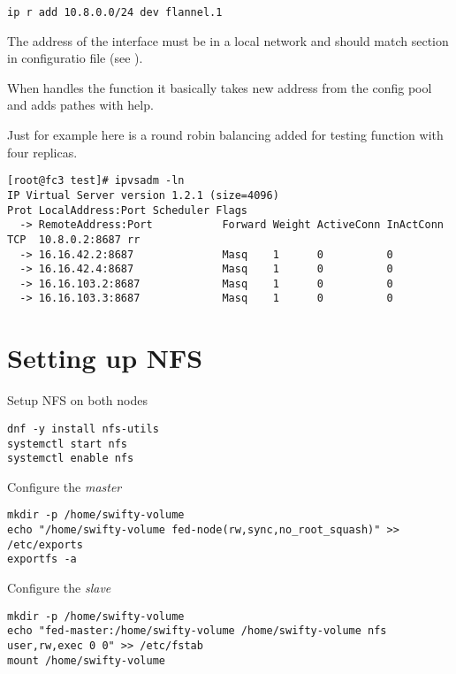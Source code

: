 \begin{lstlisting}
ip r add 10.8.0.0/24 dev flannel.1
\end{lstlisting}

The address of the interface must be in a local network and
should match  section in configuratio file
(see ).

When  handles the function it basically takes new
address from the config pool and adds pathes with 
help.

Just for example here is a round robin balancing added for
testing function with four replicas.

\begin{lstlisting}
[root@fc3 test]# ipvsadm -ln
IP Virtual Server version 1.2.1 (size=4096)
Prot LocalAddress:Port Scheduler Flags
  -> RemoteAddress:Port           Forward Weight ActiveConn InActConn
TCP  10.8.0.2:8687 rr
  -> 16.16.42.2:8687              Masq    1      0          0         
  -> 16.16.42.4:8687              Masq    1      0          0         
  -> 16.16.103.2:8687             Masq    1      0          0         
  -> 16.16.103.3:8687             Masq    1      0          0         
\end{lstlisting}

\section{Setting up NFS}
\label{sec:setup-nfs}

Setup NFS on both nodes

\begin{lstlisting}
dnf -y install nfs-utils
systemctl start nfs
systemctl enable nfs
\end{lstlisting}

Configure the \emph{master}

\begin{lstlisting}
mkdir -p /home/swifty-volume
echo "/home/swifty-volume fed-node(rw,sync,no_root_squash)" >> /etc/exports
exportfs -a
\end{lstlisting}

Configure the \emph{slave}

\begin{lstlisting}
mkdir -p /home/swifty-volume
echo "fed-master:/home/swifty-volume /home/swifty-volume nfs user,rw,exec 0 0" >> /etc/fstab
mount /home/swifty-volume
\end{lstlisting}

